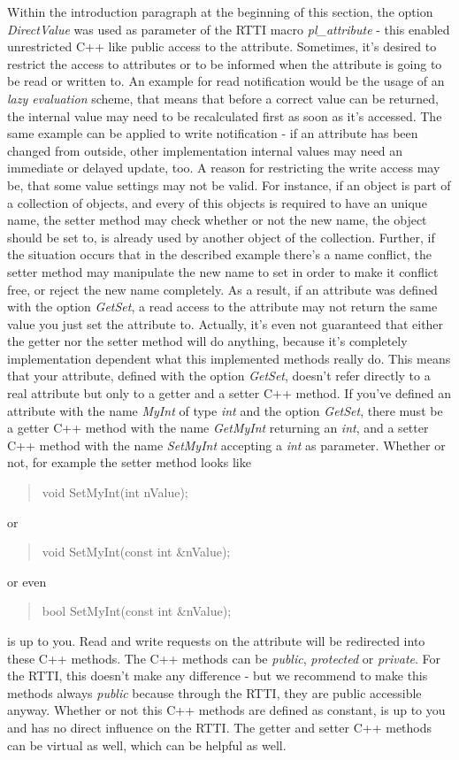 Within the introduction paragraph at the beginning of this section, the option \emph{DirectValue} was used as parameter of the \ac{RTTI} macro \emph{pl\_attribute} - this enabled unrestricted C++ like public access to the attribute. Sometimes, it's desired to restrict the access to attributes or to be informed when the attribute is going to be read or written to. An example for read notification would be the usage of an \emph{lazy evaluation} scheme, that means that before a correct value can be returned, the internal value may need to be recalculated first as soon as it's accessed. The same example can be applied to write notification - if an attribute has been changed from outside, other implementation internal values may need an immediate or delayed update, too. A reason for restricting the write access may be, that some value settings may not be valid. For instance, if an object is part of a collection of objects, and every of this objects is required to have an unique name, the setter method may check whether or not the new name, the object should be set to, is already used by another object of the collection. Further, if the situation occurs that in the described example there's a name conflict, the setter method may manipulate the new name to set in order to make it conflict free, or reject the new name completely. As a result, if an attribute was defined with the option \emph{GetSet}, a read access to the attribute may not return the same value you just set the attribute to. Actually, it's even not guaranteed that either the getter nor the setter method will do anything, because it's completely implementation dependent what this implemented methods really do. This means that your attribute, defined with the option \emph{GetSet}, doesn't refer directly to a real attribute but only to a getter and a setter C++ method. If you've defined an attribute with the name \emph{MyInt} of type \emph{int} and the option \emph{GetSet}, there must be a getter C++ method with the name \emph{GetMyInt} returning an \emph{int}, and a setter C++ method with the name \emph{SetMyInt} accepting a \emph{int} as parameter. Whether or not, for example the setter method looks like \begin{quote}void SetMyInt(int nValue);\end{quote} or \begin{quote}void SetMyInt(const int \&nValue);\end{quote} or even \begin{quote}bool SetMyInt(const int \&nValue);\end{quote} is up to you. Read and write requests on the attribute will be redirected into these C++ methods. The C++ methods can be \emph{public}, \emph{protected} or \emph{private}. For the \ac{RTTI}, this doesn't make any difference - but we recommend to make this methods always \emph{public} because through the \ac{RTTI}, they are public accessible anyway. Whether or not this C++ methods are defined as constant, is up to you and has no direct influence on the \ac{RTTI}. The getter and setter C++ methods can be virtual as well, which can be helpful as well.

